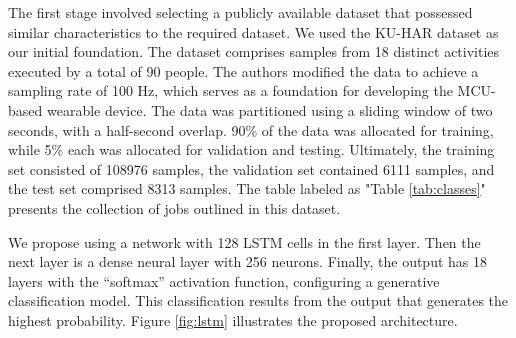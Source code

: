 The first stage involved selecting a publicly available dataset that possessed similar characteristics to the required dataset. We used the KU-HAR dataset \cite{sikder2021ku} as our initial foundation. The dataset comprises samples from 18 distinct activities executed by a total of 90 people. The authors modified the data to achieve a sampling rate of 100 Hz, which serves as a foundation for developing the MCU-based wearable device. The data was partitioned using a sliding window of two seconds, with a half-second overlap. 90\% of the data was allocated for training, while 5\% each was allocated for validation and testing. Ultimately, the training set consisted of 108976 samples, the validation set contained 6111 samples, and the test set comprised 8313 samples. The table labeled as "Table \ref{tab:classes}" presents the collection of jobs outlined in this dataset.


\begin{table}[h!]
\centering
\caption{Classes of activities in the KU-HAR dataset}
\label{tab:classes}
\end{table}

We propose using a network with 128 LSTM cells in the first layer. Then the next layer is a dense neural layer with 256 neurons. Finally, the output has 18 layers with the ``softmax'' activation function, configuring a generative classification model. This classification results from the output that generates the highest probability. Figure \ref{fig:lstm} illustrates the proposed architecture.

